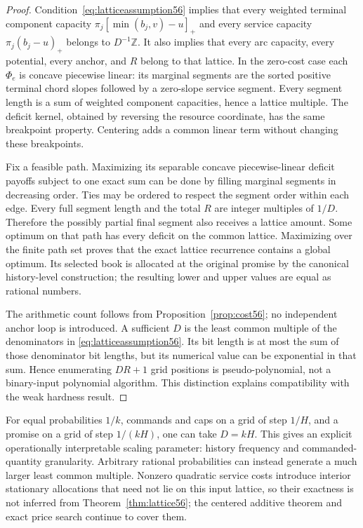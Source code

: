 \documentclass[11pt,letterpaper]{article}
\theoremstyle{definition}\newtheorem{remark}[theorem]{Remark}
\begin{document}
\begin{proof}
Condition~\eqref{eq:latticeassumption56} implies that every weighted terminal component capacity
$\pi_j[\min(b_j,v)-u]_+$ and every service capacity $\pi_j(b_j-u)_+$ belongs to $D^{-1}\mathbb Z$. It also implies that every arc capacity, every potential, every anchor, and $R$ belong to that lattice. In the zero-cost case each $\Phi_e$ is concave piecewise linear: its marginal segments are the sorted positive terminal chord slopes followed by a zero-slope service segment. Every segment length is a sum of weighted component capacities, hence a lattice multiple. The deficit kernel, obtained by reversing the resource coordinate, has the same breakpoint property. Centering adds a common linear term without changing these breakpoints.

Fix a feasible path. Maximizing its separable concave piecewise-linear deficit payoffs subject to one exact sum can be done by filling marginal segments in decreasing order. Ties may be ordered to respect the segment order within each edge. Every full segment length and the total $R$ are integer multiples of $1/D$. Therefore the possibly partial final segment also receives a lattice amount. Some optimum on that path has every deficit on the common lattice. Maximizing over the finite path set proves that the exact lattice recurrence contains a global optimum. Its selected book is allocated at the original promise by the canonical history-level construction; the resulting lower and upper values are equal as rational numbers.

The arithmetic count follows from Proposition~\ref{prop:cost56}; no independent anchor loop is introduced. A sufficient $D$ is the least common multiple of the denominators in \eqref{eq:latticeassumption56}. Its bit length is at most the sum of those denominator bit lengths, but its numerical value can be exponential in that sum. Hence enumerating $DR+1$ grid positions is pseudo-polynomial, not a binary-input polynomial algorithm. This distinction explains compatibility with the weak hardness result.
\end{proof}

For equal probabilities $1/k$, commands and caps on a grid of step $1/H$, and a promise on a grid of step $1/(kH)$, one can take $D=kH$. This gives an explicit operationally interpretable scaling parameter: history frequency and commanded-quantity granularity. Arbitrary rational probabilities can instead generate a much larger least common multiple. Nonzero quadratic service costs introduce interior stationary allocations that need not lie on this input lattice, so their exactness is not inferred from Theorem~\ref{thm:lattice56}; the centered additive theorem and exact price search continue to cover them.
\end{document}
